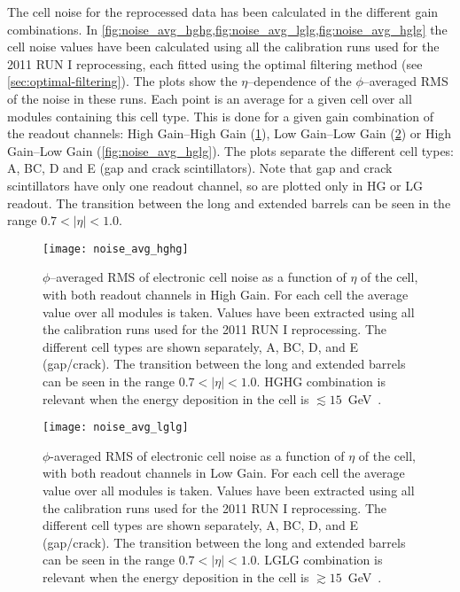 The cell noise for the reprocessed data has been calculated in the different
gain combinations. In
\cref{fig:noise_avg_hghg,fig:noise_avg_lglg,fig:noise_avg_hglg} the cell noise
values have been calculated using all the calibration runs used for the 2011 RUN
I reprocessing, each fitted using the optimal filtering method (see
\cref{sec:optimal-filtering}). The plots show the $\eta$--dependence of the
$\phi$--averaged RMS of the noise in these runs. Each point is an average for a
given cell over all modules containing this cell type. This is done for a given
gain combination of the readout channels: High Gain--High Gain
(\cref{fig:noise_avg_hghg}), Low Gain--Low Gain (\cref{fig:noise_avg_lglg}) or
High Gain--Low Gain (\cref{fig:noise_avg_hglg}). The plots separate the
different cell types: A, BC, D and E (gap and crack scintillators). Note that
gap and crack scintillators have only one readout channel, so are plotted only
in HG or LG readout. The transition between the long and extended barrels can be
seen in the range $0.7 < |\eta| < 1.0$.
\begin{figure}[!h]
  \centering
    \texttt{[image: noise\_avg\_hghg]}
    \caption{$\phi$--averaged RMS of electronic cell noise as a function of
      $\eta$ of the cell, with both readout channels in High Gain. For each cell
      the average value over all modules is taken. Values have been extracted
      using all the calibration runs used for the 2011 RUN I reprocessing. The
      different cell types are shown separately, A, BC, D, and E
      (gap/crack). The transition between the long and extended barrels can be
      seen in the range $0.7 < |\eta| < 1.0$. HGHG combination is relevant when
      the energy deposition in the cell is
      $\lesssim 15$~GeV~\cite{MyTileCalPlots}.}
    \label{fig:noise_avg_hghg}
\end{figure}

\begin{figure}[!h]
  \centering
    \texttt{[image: noise\_avg\_lglg]}
    \caption{$\phi$-averaged RMS of electronic cell noise as a function of
      $\eta$ of the cell, with both readout channels in Low Gain. For each cell
      the average value over all modules is taken. Values have been extracted
      using all the calibration runs used for the 2011 RUN I reprocessing. The
      different cell types are shown separately, A, BC, D, and E
      (gap/crack). The transition between the long and extended barrels can be
      seen in the range $0.7 < |\eta| < 1.0$. LGLG combination is relevant when
      the energy deposition in the cell is
      $\gtrsim 15$~GeV~\cite{MyTileCalPlots}.}
    \label{fig:noise_avg_lglg}
\end{figure}

